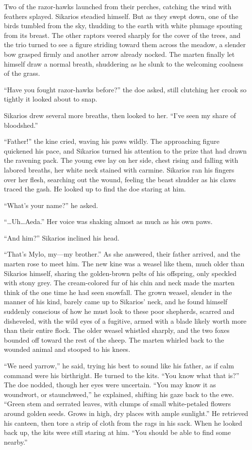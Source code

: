 Two of the razor-hawks launched from their perches, catching the wind with feathers splayed. Sikarios steadied himself. But as they swept down, one of the birds tumbled from the sky, thudding to the earth with white plumage spouting from its breast. The other raptors veered sharply for the cover of the trees, and the trio turned to see a figure striding toward them across the meadow, a slender bow grasped firmly and another arrow already nocked. The marten finally let himself draw a normal breath, shuddering as he slunk to the welcoming coolness of the grass.

``Have you fought razor-hawks before?'' the doe asked, still clutching her crook so tightly it looked about to snap.

Sikarios drew several more breaths, then looked to her. ``I've seen my share of bloodshed.''

``Father!'' the kine cried, waving his paws wildly. The approaching figure quickened his pace, and Sikarios turned his attention to the prize that had drawn the ravening pack. The young ewe lay on her side, chest rising and falling with labored breaths, her white neck stained with carmine. Sikarios ran his fingers over her flesh, searching out the wound, feeling the beast shudder as his claws traced the gash. He looked up to find the doe staring at him.

``What's your name?'' he asked.

``\ldots{}Uh\ldots{}Aeda.'' Her voice was shaking almost as much as his own paws.

``And him?'' Sikarios inclined his head.

``That's Mylo, my---my brother.'' As she answered, their father arrived, and the marten rose to meet him. The new kine was a weasel like them, much older than Sikarios himself, sharing the golden-brown pelts of his offspring, only speckled with stony grey. The cream-colored fur of his chin and neck made the marten think of the one time he had seen snowfall. The grown weasel, slender in the manner of his kind, barely came up to Sikarios' neck, and he found himself suddenly conscious of how he must look to these poor shepherds, scarred and disheveled, with the wild eyes of a fugitive, armed with a blade likely worth more than their entire flock. The older weasel whistled sharply, and the two foxes bounded off toward the rest of the sheep. The marten whirled back to the wounded animal and stooped to his knees.

``We need yarrow,'' he said, trying his best to sound like his father, as if calm command were his birthright. He turned to the kits. ``You know what that is?'' The doe nodded, though her eyes were uncertain. ``You may know it as woundwort, or staunchweed,'' he explained, shifting his gaze back to the ewe. ``Green stem and serrated leaves, with clumps of small white-petaled flowers around golden seeds. Grows in high, dry places with ample sunlight.'' He retrieved his canteen, then tore a strip of cloth from the rags in his sack. When he looked back up, the kits were still staring at him. ``You should be able to find some nearby.''

